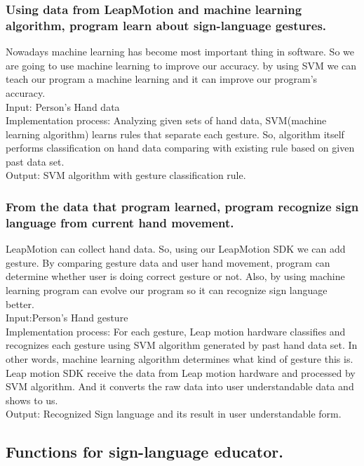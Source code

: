 \documentclass[10pt,journal,compsoc]{IEEEtran}
\begin{document}
\subsubsection {Using data from LeapMotion and machine learning algorithm, program learn about sign-language gestures.\\}
Nowadays machine learning has become most important thing in software. So we are going to use machine learning to improve our accuracy. by using SVM we can teach our program a machine learning and it can improve our program’s accuracy.
\\Input: Person's Hand data
\\Implementation process: Analyzing given sets of hand data, SVM(machine learning algorithm) learns rules that separate each gesture. So, algorithm itself performs classification on hand data comparing with existing rule based on given past data set.
\\Output: SVM algorithm with gesture classification rule.



\subsubsection {From the data that program learned, program recognize sign language from current hand movement.\\}
LeapMotion can collect hand data. So, using our LeapMotion SDK we can add gesture. By comparing gesture data and user hand movement, program can determine whether user is doing correct gesture or not. Also, by using machine learning program can evolve our program so it can recognize sign language better.
\\Input:Person's Hand gesture
\\Implementation process: For each gesture, Leap motion hardware classifies and recognizes each gesture using SVM algorithm generated by past hand data set. In other words, machine learning algorithm determines what kind of gesture this is. Leap motion SDK receive the data from Leap motion hardware and processed by SVM algorithm. And it converts the raw data into user understandable data and shows to us.
\\Output: Recognized Sign language and its result in user understandable form.

\subsection{Functions for sign-language educator.\\}
\end{document}
